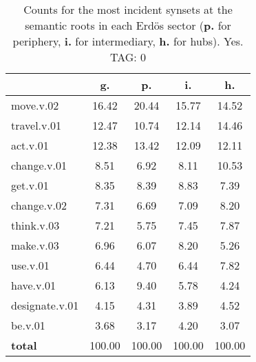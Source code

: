 \begin{table}[h!]
\begin{center}
\begin{tabular}{| l | c | c | c | c |}\hline
 & g. & p. & i. & h. \\\hline
move.v.02 & 16.42  & 20.44  & 15.77  & 14.52 \\\hline
travel.v.01 & 12.47  & 10.74  & 12.14  & 14.46 \\\hline
act.v.01 & 12.38  & 13.42  & 12.09  & 12.11 \\\hline
change.v.01 & 8.51  & 6.92  & 8.11  & 10.53 \\\hline
get.v.01 & 8.35  & 8.39  & 8.83  & 7.39 \\\hline
change.v.02 & 7.31  & 6.69  & 7.09  & 8.20 \\\hline
think.v.03 & 7.21  & 5.75  & 7.45  & 7.87 \\\hline
make.v.03 & 6.96  & 6.07  & 8.20  & 5.26 \\\hline
use.v.01 & 6.44  & 4.70  & 6.44  & 7.82 \\\hline
have.v.01 & 6.13  & 9.40  & 5.78  & 4.24 \\\hline
designate.v.01 & 4.15  & 4.31  & 3.89  & 4.52 \\\hline
be.v.01 & 3.68  & 3.17  & 4.20  & 3.07 \\\hline
{{\bf total}} & 100.00  & 100.00  & 100.00  & 100.00 \\\hline
\end{tabular}
\caption{Counts for the most incident synsets at the semantic roots in each Erd\"os sector ({\bf p.} for periphery, {\bf i.} for intermediary, {\bf h.} for hubs). Yes. TAG: 0}
\end{center}
\end{table}